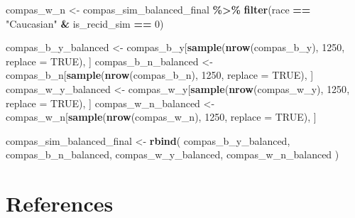 \documentclass[12pt, twoside]{amherstthesis}
\newenvironment{Shaded}{\begin{snugshade}}{\end{snugshade}}
\newcommand{\AttributeTok}[1]{\textcolor[rgb]{0.13,0.29,0.53}{#1}}
\newcommand{\ConstantTok}[1]{\textcolor[rgb]{0.56,0.35,0.01}{#1}}
\newcommand{\DecValTok}[1]{\textcolor[rgb]{0.00,0.00,0.81}{#1}}
\newcommand{\FunctionTok}[1]{\textcolor[rgb]{0.13,0.29,0.53}{\textbf{#1}}}
\newcommand{\NormalTok}[1]{#1}
\newcommand{\OtherTok}[1]{\textcolor[rgb]{0.56,0.35,0.01}{#1}}
\newcommand{\SpecialCharTok}[1]{\textcolor[rgb]{0.81,0.36,0.00}{\textbf{#1}}}
\newcommand{\StringTok}[1]{\textcolor[rgb]{0.31,0.60,0.02}{#1}}
\begin{document}
\begin{Shaded}
\begin{Highlighting}[]
\NormalTok{compas\_w\_n }\OtherTok{\textless{}{-}}\NormalTok{ compas\_sim\_balanced\_final }\SpecialCharTok{\%\textgreater{}\%}
  \FunctionTok{filter}\NormalTok{(race }\SpecialCharTok{==} \StringTok{"Caucasian"} \SpecialCharTok{\&}\NormalTok{ is\_recid\_sim }\SpecialCharTok{==} \DecValTok{0}\NormalTok{)}

\NormalTok{compas\_b\_y\_balanced }\OtherTok{\textless{}{-}}
\NormalTok{  compas\_b\_y[}\FunctionTok{sample}\NormalTok{(}\FunctionTok{nrow}\NormalTok{(compas\_b\_y), }\DecValTok{1250}\NormalTok{, }\AttributeTok{replace =} \ConstantTok{TRUE}\NormalTok{), ]}
\NormalTok{compas\_b\_n\_balanced }\OtherTok{\textless{}{-}}
\NormalTok{  compas\_b\_n[}\FunctionTok{sample}\NormalTok{(}\FunctionTok{nrow}\NormalTok{(compas\_b\_n), }\DecValTok{1250}\NormalTok{, }\AttributeTok{replace =} \ConstantTok{TRUE}\NormalTok{), ]}
\NormalTok{compas\_w\_y\_balanced }\OtherTok{\textless{}{-}}
\NormalTok{  compas\_w\_y[}\FunctionTok{sample}\NormalTok{(}\FunctionTok{nrow}\NormalTok{(compas\_w\_y), }\DecValTok{1250}\NormalTok{, }\AttributeTok{replace =} \ConstantTok{TRUE}\NormalTok{), ]}
\NormalTok{compas\_w\_n\_balanced }\OtherTok{\textless{}{-}}
\NormalTok{  compas\_w\_n[}\FunctionTok{sample}\NormalTok{(}\FunctionTok{nrow}\NormalTok{(compas\_w\_n), }\DecValTok{1250}\NormalTok{, }\AttributeTok{replace =} \ConstantTok{TRUE}\NormalTok{), ]}

\NormalTok{compas\_sim\_balanced\_final }\OtherTok{\textless{}{-}} \FunctionTok{rbind}\NormalTok{(}
\NormalTok{  compas\_b\_y\_balanced,}
\NormalTok{  compas\_b\_n\_balanced,}
\NormalTok{  compas\_w\_y\_balanced,}
\NormalTok{  compas\_w\_n\_balanced}
\NormalTok{)}
\end{Highlighting}
\end{Shaded}
\backmatter

\hypertarget{references}{%
\chapter*{References}\label{references}}

\noindent

\setlength{\parindent}{-0.20in}
\setlength{\leftskip}{0.20in}
\setlength{\parskip}{8pt}
\end{document}
